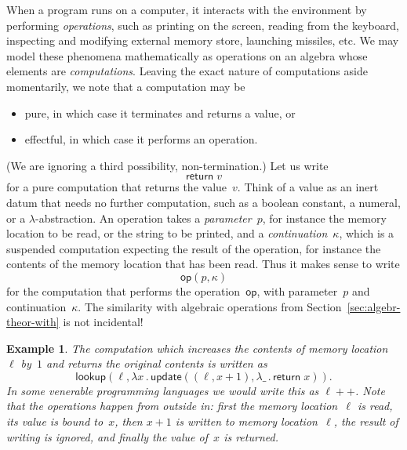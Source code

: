 \documentclass{amsart}
\newcommand{\lam}[1]{\lambda #1 \,.\,}
\newcommand{\kode}[1]{\mathsf{#1}}
\newcommand{\opcall}[3]{\kode{#1}(#2, #3)}
\newcommand{\return}[1]{\kode{return}\;#1}
\newtheorem{example}{Example}[section]
\begin{document}
When a program runs on a computer, it interacts with the environment by
performing \emph{operations}, such as printing on the screen, reading from the
keyboard, inspecting and modifying external memory store, launching missiles,
etc. We may model these phenomena mathematically as operations on an algebra
whose elements are \emph{computations}. Leaving the exact nature of computations
aside momentarily, we note that a computation may be
%
\begin{itemize}
\item pure, in which case it terminates and returns a value, or
\item effectful, in which case it performs an operation.
\end{itemize}
%
(We are ignoring a third possibility, non-termination.) Let us write
%
\begin{equation*}
  \return{v}
\end{equation*}
%
for a pure computation that returns the value~$v$. Think of a value as an inert
datum that needs no further computation, such as a boolean constant, a numeral,
or a $\lambda$-abstraction. An operation takes a \emph{parameter}~$p$, for
instance the memory location to be read, or the string to be printed, and a
\emph{continuation}~$\kappa$, which is a suspended computation expecting the
result of the operation, for instance the contents of the memory location that
has been read. Thus it makes sense to write
%
\begin{equation*}
  \opcall{op}{p}{\kappa}
\end{equation*}
%
for the computation that performs the operation~$\kode{op}$, with parameter~$p$
and continuation~$\kappa$. The similarity with algebraic operations from
Section~\ref{sec:algebr-theor-with} is not incidental!

\begin{example}
  The computation which increases the contents of memory location~$\ell$ by~$1$
  and returns the original contents is written as
  \begin{equation*}
    \opcall{lookup}{\ell}{
    \lam{x} \opcall{update}{(\ell,x + 1)}{
    \lam{\_} \return{x}
    }
    }.
  \end{equation*}
  In some venerable programming languages we would write this as $\ell{+}{+}$.
  Note that the operations happen from outside in: first the memory
  location~$\ell$ is read, its value is bound to~$x$, then $x + 1$ is written to
  memory location~$\ell$, the result of writing is ignored, and finally the
  value of~$x$ is returned.
\end{example}
\end{document}
